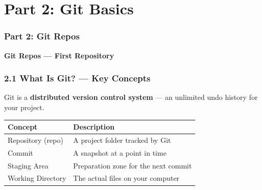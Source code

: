 \documentclass{beamer}
\begin{document}
\section{Part 2: Git Basics}

\begin{frame}
\frametitle{Part 2: Git Repos}
\centering
\Large \textbf{Git Repos --- First Repository}\\[6pt]
\end{frame}




\begin{frame}
\frametitle{2.1 What Is Git? --- Key Concepts}

Git is a \textbf{distributed version control system} --- an unlimited undo history for your project.

\vspace{4mm}
\begin{center}
\end{center}

\vspace{4mm}
\begin{table}[h]
\centering
\scriptsize
\begin{tabular}{ll}
\toprule
\textbf{Concept} & \textbf{Description} \\
\midrule
Repository (repo) & A project folder tracked by Git \\
Commit & A snapshot at a point in time \\
Staging Area & Preparation zone for the next commit \\
Working Directory & The actual files on your computer \\
\bottomrule
\end{tabular}
\end{table}
\end{frame}
\end{document}
